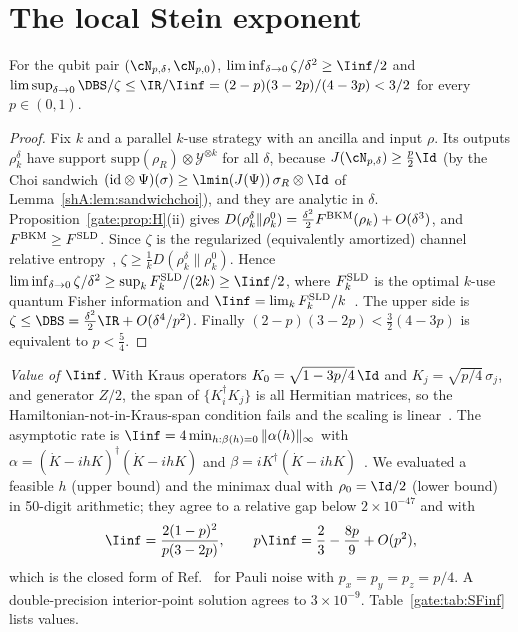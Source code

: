 \section{The local Stein exponent}\label{gate:sec:local}

\begin{proposition}\label{gate:prop:local}
For the qubit pair $(\cN_{p,\delta},\cN_{p,0})$, $\liminf_{\delta\to0}\zeta/\delta^2\ge\Iinf/2$ and $\limsup_{\delta\to0}\DBS/\zeta\le\IR/\Iinf=(2-p)(3-2p)/(4-3p)<3/2$ for every $p\in(0,1)$.
\end{proposition}

\begin{proof}
Fix $k$ and a parallel $k$-use strategy with an ancilla and input $\rho$. Its outputs $\rho_k^\delta$ have support $\mathrm{supp}(\rho_R)\otimes\mathcal Y^{\otimes k}$ for all $\delta$, because $J(\cN_{p,\delta})\ge\frac p2\Id$ (by the Choi sandwich $(\mathrm{id}\otimes\Psi)(\sigma)\ge\lmin(J(\Psi))\,\sigma_R\otimes\Id$ of Lemma~\ref{shA:lem:sandwichchoi}), and they are analytic in $\delta$. Proposition~\ref{gate:prop:H}(ii) gives $D(\rho_k^\delta\|\rho_k^0)=\frac{\delta^2}{2}F^{\rm BKM}(\rho_k)+O(\delta^3)$, and $F^{\rm BKM}\ge F^{\rm SLD}$. Since $\zeta$ is the regularized (equivalently amortized) channel relative entropy~\cite{WangWilde2019,FFRS2020}, $\zeta\ge\frac1kD(\rho_k^\delta\|\rho_k^0)$. Hence $\liminf_{\delta\to0}\zeta/\delta^2\ge\sup_kF^{\rm SLD}_k/(2k)\ge\Iinf/2$, where $F^{\rm SLD}_k$ is the optimal $k$-use quantum Fisher information and $\Iinf=\lim_kF^{\rm SLD}_k/k$~\cite{ZhouJiang2021}. The upper side is $\zeta\le\DBS=\frac{\delta^2}{2}\IR+O(\delta^4/p^2)$. Finally $(2-p)(3-2p)<\frac32(4-3p)$ is equivalent to $p<\frac54$.
\end{proof}

\emph{Value of $\Iinf$.} With Kraus operators $K_0=\sqrt{1-3p/4}\,\Id$ and $K_j=\sqrt{p/4}\,\sigma_j$, and generator $Z/2$, the span of $\{K_i^\dagger K_j\}$ is all Hermitian matrices, so the Hamiltonian-not-in-Kraus-span condition fails and the scaling is linear~\cite{ZhouJiang2021,DemkowiczDobrzanski2012}. The asymptotic rate is $\Iinf=4\min_{h:\beta(h)=0}\|\alpha(h)\|_\infty$ with $\alpha=(\dot K-ihK)^\dagger(\dot K-ihK)$ and $\beta=iK^\dagger(\dot K-ihK)$~\cite{ZhouJiang2021}. We evaluated a feasible $h$ (upper bound) and the minimax dual with $\rho_0=\Id/2$ (lower bound) in 50-digit arithmetic; they agree to a relative gap below $2\times10^{-47}$ and with
\begin{equation}
\Iinf=\frac{2(1-p)^2}{p(3-2p)},\qquad p\Iinf=\frac23-\frac{8p}{9}+O(p^2),
\end{equation}
which is the closed form of Ref.~\cite[Sec.~VII.A]{ZhouJiang2021} for Pauli noise with $p_x=p_y=p_z=p/4$. A double-precision interior-point solution agrees to $3\times10^{-9}$. Table~\ref{gate:tab:SFinf} lists values.

